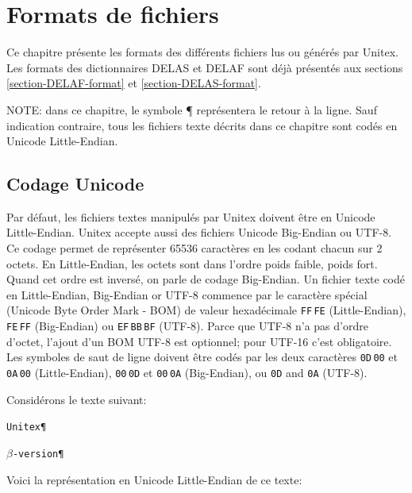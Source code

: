 \chapter{Formats de fichiers}
\label{chap-file-formats}
Ce chapitre présente les formats des différents fichiers lus ou générés par Unitex. Les
formats des dictionnaires DELAS et DELAF sont déjà présentés aux sections
\ref{section-DELAF-format} et \ref{section-DELAS-format}.

\bigskip
\noindent NOTE: dans ce chapitre, le symbole ¶ représentera le retour à la ligne. Sauf indication
contraire, tous les fichiers texte décrits dans ce chapitre sont codés en Unicode Little-Endian.


\section{Codage Unicode}
\label{unicode-encoding}
Par défaut, les fichiers textes manipulés par Unitex doivent être en Unicode Little-Endian.
Unitex accepte aussi des fichiers Unicode Big-Endian ou UTF-8. Ce codage permet de représenter 65536
caractères en les codant chacun sur 2 octets. En Little-Endian, les octets sont dans l’ordre poids
faible, poids fort. Quand cet ordre est inversé, on parle de codage Big-Endian. Un fichier texte codé
en Little-Endian, Big-Endian or UTF-8 commence par le caractère spécial  (Unicode Byte Order Mark - BOM) de valeur hexadécimale \verb+FF+\,\verb+FE+ (Little-Endian), \verb+FE+\,\verb+FF+ (Big-Endian)
ou \verb+EF+\,\verb+BB+\,\verb+BF+ (UTF-8). 
Parce que UTF-8 n'a pas d'ordre d'octet, l'ajout d'un BOM UTF-8 est optionnel; pour UTF-16 c'est
obligatoire. Les symboles de saut de ligne doivent être codés par les deux caractères
\verb+0D+\,\verb+00+ et \verb+0A+\,\verb+00+ (Little-Endian), 
\verb+00+\,\verb+0D+ et \verb+00+\,\verb+0A+ (Big-Endian), ou \verb+0D+ and \verb+0A+ (UTF-8).

\bigskip
\noindent Considérons le texte suivant:

\bigskip
\texttt{Unitex\P}

\texttt{$\beta$-version\P}

\bigskip
\noindent Voici la représentation en Unicode Little-Endian de ce texte:

